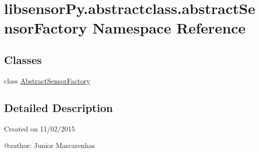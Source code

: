 \hypertarget{namespacelibsensorPy_1_1abstractclass_1_1abstractSensorFactory}{}\section{libsensor\+Py.\+abstractclass.\+abstract\+Sensor\+Factory Namespace Reference}
\label{namespacelibsensorPy_1_1abstractclass_1_1abstractSensorFactory}
\subsection*{Classes}
\begin{DoxyCompactItemize}
\item 
class \hyperlink{classlibsensorPy_1_1abstractclass_1_1abstractSensorFactory_1_1AbstractSensorFactory}{Abstract\+Sensor\+Factory}
\end{DoxyCompactItemize}


\subsection{Detailed Description}
\begin{DoxyVerb}Created on 11/02/2015

@author: Junior Mascarenhas
\end{DoxyVerb}
 